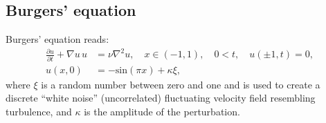 \subsection{Burgers' equation}
\label{sec:mortensen:burgers}

Burgers' equation reads:
\begin{align}
 \frac{\partial u}{\partial t}+\nabla u \, u
  &= \nu \nabla^2 u, \quad x \in (-1,1), \quad 0<t, \quad u(\pm 1,t)=0,
\\
 u(x,0) &=-\text{sin}(\pi x)+\kappa \xi,
\label{eq:mortensen:burgers}
\end{align}
where $\xi$ is a random number between zero and one and is used to create
a discrete ``white noise'' (uncorrelated) fluctuating velocity field
resembling turbulence, and $\kappa$ is the amplitude of the perturbation.

